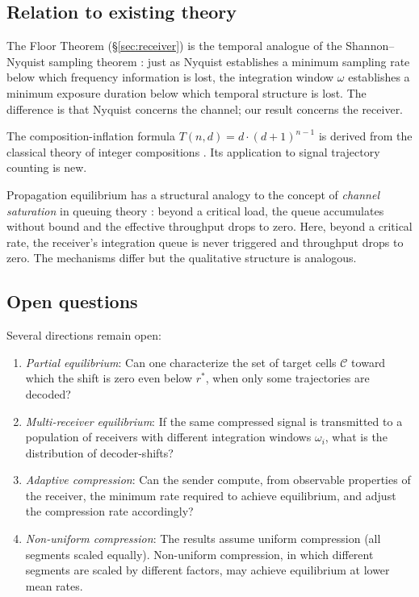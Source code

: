 \documentclass[twocolumn,11pt,a4paper]{article}
\theoremstyle{main}
\theoremstyle{definition}
\theoremstyle{remark}
\newcommand{\Cell}{\mathcal{C}}
\newcommand{\Traj}{T}
\newcommand{\rate}{r}
\newcommand{\window}{\omega}
\begin{document}
\subsection{Relation to existing theory}

The Floor Theorem (\S\ref{sec:receiver}) is the temporal analogue of
the Shannon--Nyquist sampling theorem \citep{nyquist1928, shannon1949}:
just as Nyquist establishes a minimum sampling rate below which
frequency information is lost, the integration window $\window$
establishes a minimum exposure duration below which temporal structure
is lost. The difference is that Nyquist concerns the channel; our
result concerns the receiver.

The composition-inflation formula $\Traj(n,d) = d \cdot (d+1)^{n-1}$
is derived from the classical theory of integer compositions
\citep{andrews1976, heubach2009}. Its application to signal trajectory
counting is new.

Propagation equilibrium has a structural analogy to the concept of
\emph{channel saturation} in queuing theory \citep{kleinrock1975}:
beyond a critical load, the queue accumulates without bound and the
effective throughput drops to zero. Here, beyond a critical rate, the
receiver's integration queue is never triggered and throughput drops
to zero. The mechanisms differ but the qualitative structure is
analogous.

\subsection{Open questions}

Several directions remain open:

\begin{enumerate}[label=(\roman*), leftmargin=1.4em, itemsep=2pt]
\item \emph{Partial equilibrium}: Can one characterize the set of target
  cells $\Cell$ toward which the shift is zero even below $\rate^*$,
  when only some trajectories are decoded?

\item \emph{Multi-receiver equilibrium}: If the same compressed signal
  is transmitted to a population of receivers with different integration
  windows $\window_i$, what is the distribution of decoder-shifts?

\item \emph{Adaptive compression}: Can the sender compute, from
  observable properties of the receiver, the minimum rate required to
  achieve equilibrium, and adjust the compression rate accordingly?

\item \emph{Non-uniform compression}: The results assume uniform
  compression (all segments scaled equally). Non-uniform compression,
  in which different segments are scaled by different factors, may
  achieve equilibrium at lower mean rates.
\end{enumerate}
\end{document}
